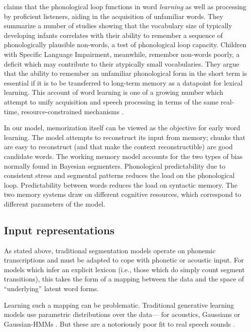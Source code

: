 \documentclass[11pt,letterpaper]{article}
\begin{document}
 claims that the phonological loop functions in
word \textit{learning} as well as processing by proficient listeners,
aiding in the acquisition of unfamiliar words. They summarize a number
of studies showing that the vocabulary size of typically developing
infants correlates with their ability to remember a sequence of
phonologically plausible non-words, a test of phonological loop
capacity. Children with Specific Language Impairment, meanwhile,
remember non-words poorly, a deficit which may contribute to their
atypically small vocabularies. They argue that the ability to remember
an unfamiliar phonological form in the short term is essential if it
is to be transferred to long-term memory as a datapoint for lexical
learning. This account of word learning is one of a growing number
which attempt to unify acquisition and speech processing in terms of
the same real-time, resource-constrained mechanisms
\cite{Apfelbaum16}.

In our model, memorization itself can be viewed as the objective for
early word learning. The model attempts to reconstruct its input from
memory; chunks that are easy to reconstruct (and that make the context
reconstructible) are good candidate words. The working memory model
accounts for the two types of bias normally found in Bayesian
segmenters. Phonological predictability due to consistent stress
\cite{Boerschinger14} and segmental patterns \cite{Johnson09} reduces
the load on the phonological loop.  Predictability between words
reduces the load on syntactic memory. The two memory systems draw on
different cognitive resources, which correspond to different
parameters of the model.

\subsection{Input representations}
\label{sub-representations}

As stated above, traditional segmentation models operate on phonemic
transcriptions and must be adapted to cope with phonetic or acoustic
input. For models which infer an explicit lexicon (i.e., those which
do simply count segment transitions), this takes the form of a mapping
between the data and the space of ``underlying'' latent word
forms.

Learning such a mapping can be problematic. Traditional generative
learning models use parametric distributions over the data--- for
acoustics, Gaussians \cite{Vallabha07,Feldman09} or Gaussian-HMMs
\cite{Lee12,Lee15}. But these are a notoriously poor fit to real speech sounds
\cite{Glass?}.
\end{document}
